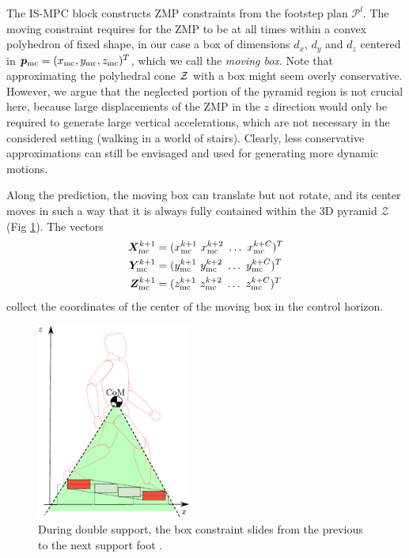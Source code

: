 The IS-MPC block constructs ZMP constraints from the footstep plan
$\mathcal{P}^l$. The moving constraint requires for the ZMP to be at all
times within a convex
polyhedron of fixed shape, in our case a box of dimensions $d_x$, $d_y$ and
$d_z$ centered in ${\bm{p}}_{\rm mc}=(x_{\rm mc}, y_{\rm mc}, z_{\rm mc})^T$,
which we call the \textit{moving box}. Note that approximating the polyhedral cone
$\cal Z$ with a box might seem overly conservative. However, we argue that the
neglected portion of the pyramid region is not crucial here, because large
displacements of the ZMP in the $z$ direction would only be required to generate
large vertical accelerations, which are not necessary in the considered setting
(walking in a world of stairs). Clearly, less conservative approximations can
still be envisaged and used for generating more dynamic motions.

Along the prediction, the moving box can translate but not rotate, and its
center moves in such a way that it is always
fully contained within the 3D pyramid $\mathcal{Z}$
(Fig \ref{fig:SYROCO18-double-support3D}).
The vectors
\begin{align*}
    \bm{X}_{\rm mc}^{k+1} &= (x_{\rm mc}^{k+1} \ x_{\rm mc}^{k+2} \ \dots \ x_{\rm mc}^{k+C})^T \\
    \bm{Y}_{\rm mc}^{k+1} &= (y_{\rm mc}^{k+1} \ y_{\rm mc}^{k+2} \ \dots \ y_{\rm mc}^{k+C})^T \\
    \bm{Z}_{\rm mc}^{k+1} &= (z_{\rm mc}^{k+1} \ z_{\rm mc}^{k+2} \ \dots \ z_{\rm mc}^{k+C})^T
\end{align*}
collect the coordinates of the center of the moving box in the control horizon.
\begin{figure}
    \centering
    \includegraphics[width=0.45\textwidth]{figures/SYROCO18-double-support3D.pdf}
    \caption{During double support, the box constraint slides from the
        previous to the next support foot \cite{Zamparelli2018SYROCO}.}
    \label{fig:SYROCO18-double-support3D}
\end{figure}


